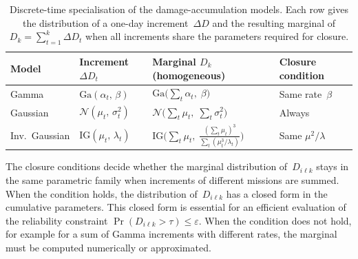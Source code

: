 \documentclass[11pt,a4paper]{article}
\theoremstyle{plain}
\theoremstyle{definition}
\theoremstyle{remark}
\begin{document}
\begin{table}[htbp]
\centering
\caption{Discrete-time specialisation of the damage-accumulation models.
Each row gives the distribution of a one-day increment~$\Delta D$ and the resulting marginal of $D_k = \sum_{t=1}^{k}\Delta D_t$ when all increments share the parameters required for closure.}
\label{tab:discrete_models}
\small
\begin{tabularx}{\linewidth}{@{}>{\hsize=0.613\hsize\raggedright\arraybackslash}X>{\hsize=0.993\hsize\raggedright\arraybackslash}X>{\hsize=1.168\hsize\raggedright\arraybackslash}X>{\hsize=1.226\hsize\raggedright\arraybackslash}X@{}}
\toprule
\rowcolor{headgrey}
\textbf{Model} & \textbf{Increment} $\Delta D_t$ & \textbf{Marginal} $D_k$ (homogeneous) & \textbf{Closure condition} \\
\midrule
Gamma
  & $\mathrm{Ga}(\alpha_t,\,\beta)$
  & $\mathrm{Ga}\!\bigl(\sum_{t}\alpha_t,\;\beta\bigr)$
  & Same rate~$\beta$ \\[4pt]
Gaussian
  & $\mathcal{N}(\mu_t,\,\sigma_t^2)$
  & $\mathcal{N}\!\bigl(\sum_{t}\mu_t,\;\sum_{t}\sigma_t^2\bigr)$
  & Always \\[4pt]
Inv.\ Gaussian
  & $\mathrm{IG}(\mu_t,\,\lambda_t)$
  & $\mathrm{IG}\!\bigl(\sum_{t}\mu_t,\;\frac{(\sum_t \mu_t)^3}{ \sum_t(\mu_t^3/\lambda_t)}\bigr)$
  & Same $\mu^2/\lambda$ \\
\bottomrule
\end{tabularx}
\end{table}

The closure conditions decide whether the marginal distribution of~$D_{i\ell k}$ stays in the same parametric family when increments of different missions are summed.
When the condition holds, the distribution of~$D_{i\ell k}$ has a closed form in the cumulative parameters.
This closed form is essential for an efficient evaluation of the reliability constraint $\Pr(D_{i\ell k} > \tau) \le \varepsilon$.
When the condition does not hold, for example for a sum of Gamma increments with different rates, the marginal must be computed numerically or approximated.
\end{document}
